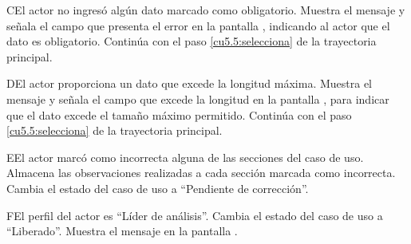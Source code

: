  \begin{UCtrayectoriaA}{C}{El actor no ingresó algún dato marcado como obligatorio.}
    \UCpaso[\UCsist] Muestra el mensaje  y señala el campo que presenta el error en la pantalla , indicando al actor que el dato es obligatorio.
    \UCpaso[] Continúa con el paso \ref{cu5.5:selecciona} de la trayectoria principal.
 \end{UCtrayectoriaA}
 
 \begin{UCtrayectoriaA}{D}{El actor proporciona un dato que excede la longitud máxima.}
    \UCpaso[\UCsist] Muestra el mensaje  y señala el campo que excede la 
    longitud en la pantalla , para indicar que el dato excede el tamaño máximo permitido.
    \UCpaso[] Continúa con el paso \ref{cu5.5:selecciona} de la trayectoria principal.
 \end{UCtrayectoriaA}
 
 \begin{UCtrayectoriaA}{E}{El actor marcó como incorrecta alguna de las secciones del caso de uso.}
    \UCpaso[\UCsist] Almacena las observaciones realizadas a cada sección marcada como incorrecta.
    \UCpaso[\UCsist] Cambia el estado del caso de uso a ``Pendiente de corrección''.
 \end{UCtrayectoriaA}
 
 \begin{UCtrayectoriaA}{F}{El perfil del actor es ``Líder de análisis''.}
 \UCpaso[\UCsist] Cambia el estado del caso de uso a ``Liberado''.
 \UCpaso[\UCsist] Muestra el mensaje  en la pantalla .
 \end{UCtrayectoriaA}